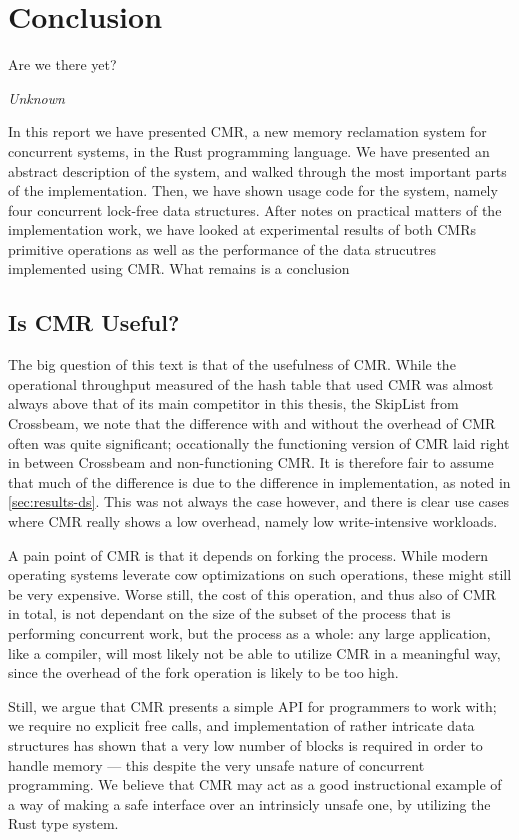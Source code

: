 \chapter{Conclusion\label{ch:conclusion}}
\epigraph{Are we there yet?}{\textit{Unknown}}

In this report we have presented CMR, a new memory reclamation system for concurrent systems, in
the Rust programming language. We have presented an abstract description of the system, and walked
through the most important parts of the implementation. Then, we have shown usage code for the
system, namely four concurrent lock-free data structures. After notes on practical matters of the
implementation work, we have looked at experimental results of both CMRs primitive operations as
well as the performance of the data strucutres implemented using CMR\@. What remains is a
conclusion

\clearpage

\section{Is CMR Useful?}

The big question of this text is that of the usefulness of CMR\@. While the operational throughput
measured of the hash table that used CMR was almost always above that of its main competitor in
this thesis, the SkipList from Crossbeam, we note that the difference with and without the overhead
of CMR often was quite significant; occationally the functioning version of CMR laid right in
between Crossbeam and non-functioning CMR\@.  It is therefore fair to assume that much of the
difference is due to the difference in implementation, as noted in \cref{sec:results-ds}. This was
not always the case however, and there is clear use cases where CMR really shows a low overhead,
namely low write-intensive workloads.

A pain point of CMR is that it depends on forking the process. While modern operating systems
leverate \gls{cow} optimizations on such operations, these might still be very expensive.  Worse
still, the cost of this operation, and thus also of CMR in total, is not dependant on the size of
the subset of the process that is performing concurrent work, but the process as a whole: any large
application, like a compiler, will most likely not be able to utilize CMR in a meaningful way,
since the overhead of the fork operation is likely to be too high.

Still, we argue that CMR presents a simple API for programmers to work with; we require no explicit
free calls, and implementation of rather intricate data structures has shown that a very low number
of  blocks is required in order to handle memory --- this despite the very unsafe
nature of concurrent programming. We believe that CMR may act as a good instructional example of
a way of making a safe interface over an intrinsicly unsafe one, by utilizing the Rust type system.


